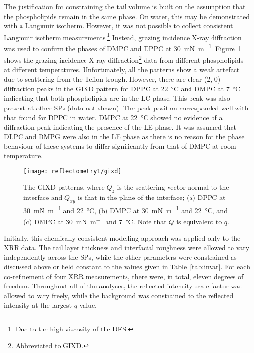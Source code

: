The justification for constraining the tail volume is built on the assumption that the phospholipids remain in the same phase.
On water, this may be demonstrated with a Langmuir isotherm.
However, it was not possible to collect consistent Langmuir isotherm measurements.\footnote{Due to the high viscosity of the DES.}
Instead, grazing incidence X-ray diffraction was used to confirm the phases of DMPC and DPPC at \SI{30}{\milli\newton\per\meter}.
Figure~\ref{fig:gixd} shows the grazing-incidence X-ray diffraction\footnote{Abbreviated to GIXD.} data from different phospholipids at different temperatures.
Unfortunately, all the patterns show a weak artefact due to scattering from the Teflon trough.
However, there are clear (2, 0) diffraction peaks in the GIXD pattern for DPPC at \SI{22}{\celsius} and DMPC at \SI{7}{\celsius} indicating that both phospholipids are in the LC phase.
This peak was also present at other SPs (data not shown).
The peak position corresponded well with that found for DPPC in water.\autocite{watkins_structure_2009}
DMPC at \SI{22}{\celsius} showed no evidence of a diffraction peak indicating the presence of the LE phase.
It was assumed that DLPC and DMPG were also in the LE phase as there is no reason for the phase behaviour of these systems to differ significantly from that of DMPC at room temperature.
%
\begin{figure}[t]
    \forcerectofloat
    \centering
    \texttt{[image: reflectometry1/gixd]}
    \caption{The GIXD patterns, where $Q_z$ is the scattering vector normal to the interface and $Q_{xy}$ is that in the plane of the interface; (a) DPPC at \SI{30}{\milli\newton\per\meter} and \SI{22}{\celsius}, (b) DMPC at \SI{30}{\milli\newton\per\meter} and \SI{22}{\celsius}, and (c) DMPC at \SI{30}{\milli\newton\per\meter} and \SI{7}{\celsius}. Note that $Q$ is equivalent to $q$.}
    \label{fig:gixd}
\end{figure}
%

Initially, this chemically-consistent modelling approach was applied only to the XRR data.
The tail layer thickness and interfacial roughness were allowed to vary independently across the SPs, while the other parameters were constrained as discussed above or held constant to the values given in Table~\ref{tab:invar}.
For each co-refinement of four XRR measurements, there were, in total, eleven degrees of freedom.
Throughout all of the analyses, the reflected intensity scale factor was allowed to vary freely, while the background was constrained to the reflected intensity at the largest $q$-value.

